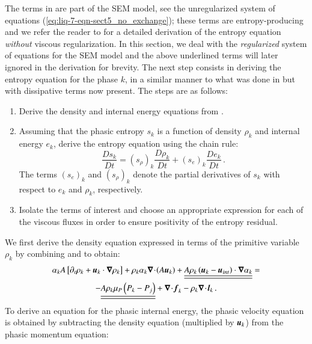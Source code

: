 \documentclass[preprint,10pt]{elsarticle}
\begin{document}
%
The terms in  are part of the SEM model, see the unregularized system of equations (\eqref{eq:liq-7-eqn-sect5_no_exchange}); these terms are entropy-producing and we refer the reader to  for a detailed derivation of the 
entropy equation  \emph{without} viscous regularization. 
In this section, we deal with the \emph{regularized} system of equations for the SEM model and 
the above underlined terms will later ignored in the derivation for brevity. 
%
The next step consists in deriving the entropy equation for the phase $k$, in a similar manner to what was done in  but 
with dissipative terms now present. The steps are as follows:
%
\begin{enumerate}
\item Derive the density and internal energy equations from .
\item Assuming that the phasic entropy $s_k$ is a function of density $\rho_k$ and internal energy $e_k$, derive the entropy equation using the chain rule:
\begin{equation}
\label{eq:chain_rule-sct4}
\frac{Ds_k}{Dt} = \left( s_{\rho} \right)_k \frac{D \rho_k}{Dt} + \left( s_{e} \right)_k \frac{D e_k}{Dt} \,.
\end{equation}
The terms $(s_e)_k$ and $(s_{\rho})_k$ denote the partial derivatives of $s_k$ with respect to $e_k$ and $\rho_k$, respectively.
\item Isolate the terms of interest and choose an appropriate expression for each of the viscous fluxes in order to ensure positivity of the entropy residual.
\end{enumerate}
%
We first derive the density equation expressed in terms of the primitive variable $\rho_k$ by combining  and  to obtain:
%
\begin{multline}\label{eq:rho-7-eqn-model-sect4}
\alpha_k A \left[ \partial_t \rho_k + \boldsymbol u_k  \cdot \boldsymbol\nabla \rho_k \right] 
+ \rho_k \alpha_k \boldsymbol\nabla\! \cdot \! (A \boldsymbol u_k ) 
+  \underline{\underline{ A \rho_k \left( \boldsymbol u_k - \boldsymbol u_{int} \right) \cdot \boldsymbol\nabla \alpha_k}} = \\-\underline{\underline{A \rho_k \mu_P \left( P_k - P_j \right)}} + \boldsymbol\nabla\! \cdot \! \boldsymbol f_k - \rho_k \boldsymbol\nabla\! \cdot \! \boldsymbol l_k \,.
\end{multline}
%
To derive an equation for the phasic internal energy, the phasic velocity equation is obtained by subtracting the density equation (multiplied by $\boldsymbol u_k$) from the phasic momentum equation:
\end{document}
